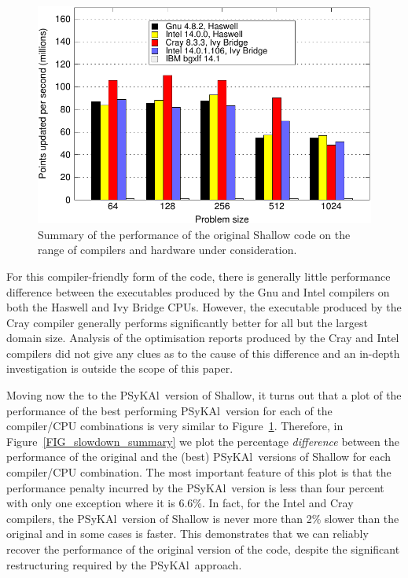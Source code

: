 \documentclass{IOS-Book-Article}
\newcommand{\psykal}{{PS}y{KA}l\ }
\begin{document}
\begin{figure}[!t]
\centering
\includegraphics[width=120mm]{orig_summary}
\caption{Summary of the performance of the original Shallow code on
  the range of compilers and hardware under consideration.}
\label{FIG_orig_perf_summary}
\end{figure}

For this compiler-friendly form of the code, there is generally little
performance difference between the executables produced by the Gnu and
Intel compilers on both the Haswell and Ivy Bridge CPUs. However, the
executable produced by the Cray compiler generally performs
significantly better for all but the largest domain size. Analysis of
the optimisation reports produced by the Cray and Intel compilers did
not give any clues as to the cause of this difference and an in-depth
investigation is outside the scope of this paper.

Moving now the to the \psykal version of Shallow, it turns out that a
plot of the performance of the best performing \psykal version for
each of the compiler/CPU combinations is very similar to
Figure~\ref{FIG_orig_perf_summary}. Therefore, in
Figure~\ref{FIG_slowdown_summary} we plot the percentage {\em
  difference} between the performance of the original and the (best)
\psykal versions of Shallow for each compiler/CPU combination. The
most important feature of this plot is that the performance penalty
incurred by the \psykal version is less than four percent with only
one exception where it is 6.6\%.  In fact, for the Intel and Cray
compilers, the \psykal version of Shallow is never more than 2\%
slower than the original and in some cases is faster.  This
demonstrates that we can reliably recover the performance of the
original version of the code, despite the significant restructuring
required by the \psykal approach.
\end{document}
